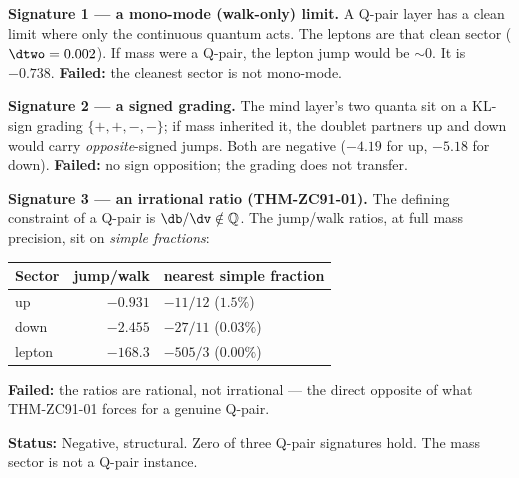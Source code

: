 \documentclass[12pt, a4paper]{article}
\begin{document}
\begin{formalbox}[title={FIND-ZC105-01: The mass sector fails all three Q-pair signatures ($R_1$, numerical)}]

\textbf{Signature 1 --- a mono-mode (walk-only) limit.} A Q-pair layer has a
clean limit where only the continuous quantum acts. The leptons are that clean
sector ($\dtwo=0.002$). If mass were a Q-pair, the lepton jump would be
$\sim0$. It is $-0.738$. \textbf{Failed:} the cleanest sector is not mono-mode.

\textbf{Signature 2 --- a signed grading.} The mind layer's two quanta sit on a
KL-sign grading $\{+,+,-,-\}$; if mass inherited it, the doublet partners up and
down would carry \emph{opposite}-signed jumps. Both are negative ($-4.19$ for up,
$-5.18$ for down). \textbf{Failed:} no sign opposition; the grading does not
transfer.

\textbf{Signature 3 --- an irrational ratio (THM-ZC91-01).} The defining
constraint of a Q-pair is $\db/\dv\notin\mathbb{Q}$. The jump/walk ratios, at
full mass precision, sit on \emph{simple fractions}:
\begin{center}
{\small\renewcommand{\arraystretch}{1.25}
\begin{tabular}{@{}lrl@{}}
\toprule
Sector & jump/walk & nearest simple fraction \\
\midrule
up     & $-0.931$  & $-11/12$ ($1.5\%$) \\
down   & $-2.455$  & $-27/11$ ($0.03\%$) \\
lepton & $-168.3$  & $-505/3$ ($0.00\%$) \\
\bottomrule
\end{tabular}}
\end{center}
\textbf{Failed:} the ratios are rational, not irrational --- the direct opposite
of what THM-ZC91-01 forces for a genuine Q-pair.

\textbf{Status:} Negative, structural. Zero of three Q-pair signatures hold. The
mass sector is not a Q-pair instance.
\end{formalbox}

\end{document}
